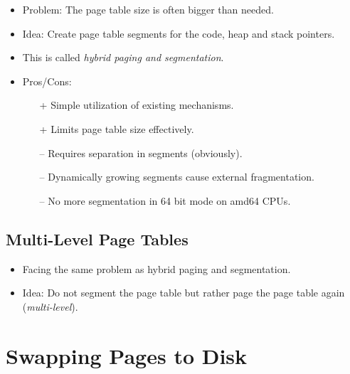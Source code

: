 	        \begin{itemize}
	        	\item Problem: The page table size is often bigger than needed.
	        	\item Idea: Create page table segments for the code, heap and stack pointers.
	        	\item This is called \textit{hybrid paging and segmentation}.
	        	\item Pros/Cons:
		        	\begin{itemize}
		        		\item[+] Simple utilization of existing mechanisms.
		        		\item[+] Limits page table size effectively.
		        		\item[--] Requires separation in segments (obviously).
		        		\item[--] Dynamically growing segments cause external fragmentation.
		        		\item[--] No more segmentation in 64 bit mode on amd64 CPUs.
		        	\end{itemize}
	        \end{itemize}

        \subsection{Multi-Level Page Tables} %
	        \label{sec:multilevelpaging}
	        
        
	        \begin{itemize}
	        	\item Facing the same problem as hybrid paging and segmentation.
	        	\item Idea: Do not segment the page table but rather page the page table again (\textit{multi-level}).
	        \end{itemize}

    \section{Swapping Pages to Disk} %
    
